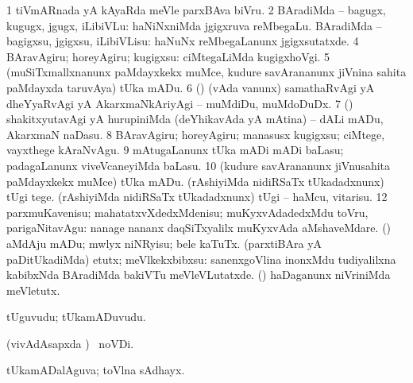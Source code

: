 {{{\noindent 
\gl{\pagu}
\expl{}
\bmng
\bnum
\num{1}  tiVmARnada yA kAyaRda meVle parxBAva biVru. 
\num{2}  
  BAradiMda -- bagugx, kugugx, jgugx, iLibiVLu: 
\banum
{}  haNiNxniMda jgigxruva reMbegaLu. 
 BAradiMda -- bagigxsu, jgigxsu, iLibiVLisu:  haNuNx reMbegaLanunx jgigxsutatxde. 
\eanum
\numie
\num{4} BAravAgiru; horeyAgiru; kugigxsu:  ciMtegaLiMda kugigxhoVgi. 
\num{5}  (muSiTxmallxnanunx paMdayxkekx muMce, kudure savArananunx jiVnina sahita paMdayxda taruvAya) tUka mADu. 
\num{6}  (\AmA) (vAda \mo vanunx) samathaRvAgi yA dheYyaRvAgi yA AkarxmaNkAriyAgi -- muMdiDu, muMdoDuDx. 
\num{7}  (\AmA) shakitxyutavAgi yA hurupiniMda (deYhikavAda yA mAtina) -- dALi mADu, AkarxmaN naDasu. 
\num{8} BAravAgiru; horeyAgiru; manasusx kugigxsu; ciMtege, vayxthege kAraNvAgu. 
\num{9}  mAtugaLanunx tUka mADi mADi baLasu; padagaLanunx viveVcaneyiMda baLasu. 
\num{10}  (kudure savArananunx jiVnusahita paMdayxkekx muMce) tUka mADu. 
  
\banum
{} (rAshiyiMda nidiRSaTx tUkadadxnunx) tUgi tege. 
 (rAshiyiMda nidiRSaTx tUkadadxnunx) tUgi -- haMcu, vitarisu. 
\eanum
\numie
\num{12}  parxmuKavenisu; mahatatxvXdedxMdenisu; muKyxvAdadedxMdu toVru, parigaNitavAgu:  nanage nananx daqSiTxyalilx muKyxvAda aMshaveMdare. 
  
\banum
{} (\AmA) aMdAju mADu; mwlyx niNRyisu; bele kaTuTx. 
 (parxtiBAra yA paDitUkadiMda) etutx; meVlkekxbibxsu:  sanenxgoVlina inonxMdu tudiyalilxna kabibxNda BAradiMda bakiVTu meVleVLutatxde.  (\viparx) haDaganunx niVriniMda meVletutx. 
\eanum
\numie
\enum
\emng
\eentry

\bentry
{} 
\gl{\nA}
\expl{}
\bmng
tUguvudu; tUkamADuvudu. 
\emng

\noindent
\gl{\pagu}
\expl{}
\bmng
{} (vivAdAsapxda \parx)  \pagu\ noVDi. 
\emng
\eentry

\bentry
{} 
\gl{\gu}
\expl{}
\bmng
tUkamADalAguva; toVlna sAdhayx. 
\emng
\eentry

}}}
